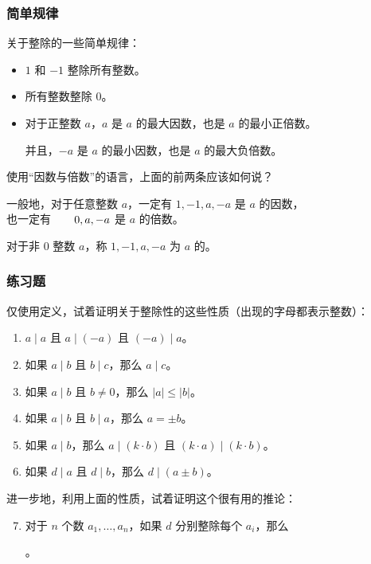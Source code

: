 \begin{frame}
  \frametitle{简单规律}
  关于整除的一些简单规律：
  \pause
  \begin{itemize}
    \item $1$ 和 $-1$ 整除所有整数。
    \pause
    \item 所有整数整除 $0$。
    \pause
    \item 对于\alert{正}整数 $a$，$a$ 是 $a$ 的最大因数，也是 $a$ 的最小\alert{正}倍数。
    
    并且，$-a$ 是 $a$ 的最小因数，也是 $a$ 的最大负倍数。
  \end{itemize}
  \pause
  使用“因数与倍数”的语言，上面的前两条应该如何说？
  \pause
  
  \emptyline
  一般地，对于任意整数 $a$，一定有 $1, -1, a, -a$ 是 $a$ 的因数，\\
  \-\hspace{10em}\hphantom{ $a$}也一定有 $\hphantom{0, -{}}0, a, -a$ 是 $a$ 的倍数。
  
  对于非 $0$ 整数 $a$，称 $1, -1, a, -a$ 为 $a$ 的。
\end{frame}
\begin{frame}
  \frametitle{练习题}
  仅使用定义，试着证明关于整除性的这些性质（出现的字母都表示整数）：
  \pause
  \begin{enumerate}
    \setlength{\itemsep}{2pt}
    \item $a \mid a$ 且 $a \mid (-a)$ 且 $(-a) \mid a$。
    \pause
    \item 如果 $a \mid b$ 且 $b \mid c$，那么 $a \mid c$。
    \pause
    \item 如果 $a \mid b$ 且 $b \ne 0$，那么 $\lvert a \rvert \le \lvert b \rvert$。
    \pause
    \item 如果 $a \mid b$ 且 $b \mid a$，那么 $a = \pm b$。
    \pause
    \item 如果 $a \mid b$，那么 $a \mid (k \cdot b)$ 且 $(k \cdot a) \mid (k \cdot b)$。
    \pause
    \item 如果 $d \mid a$ 且 $d \mid b$，那么 $d \mid (a \pm b)$。
  \end{enumerate}
  \pause
  进一步地，利用上面的性质，试着证明这个很有用的推论：
  \pause
  \begin{enumerate}
    \setcounter{enumi}{6}
    \item 对于 $n$ 个数 $a_1, \ldots, a_n$，如果 $d$ 分别整除每个 $a_i$，那么
    \begin{center}
      。
    \end{center}
  \end{enumerate}
\end{frame}
